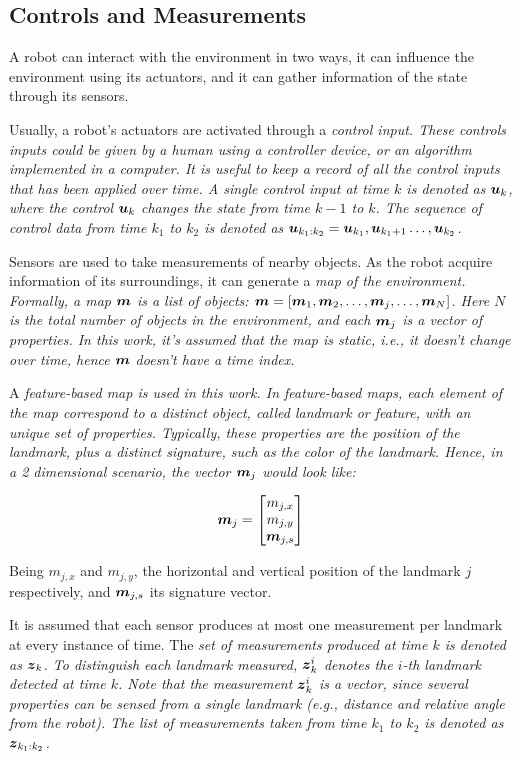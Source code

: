 \subsection{Controls and Measurements}

A robot can interact with the environment in two ways, it can influence the environment using its actuators, and it can gather information of the state through its sensors. 

Usually, a robot's actuators are activated through a \it{control input}. These controls inputs could be given by a human using a controller device, or an algorithm implemented in a computer. It is useful to keep a record of all the control inputs that has been applied over time. A single control input at time $k$ is denoted as $\boldsymbol{u}_k$, where the control $\boldsymbol{u}_k$ changes the state from  time $k-1$ to $k$. The sequence of control data from time $k_1$ to $k_2$ is denoted as $\boldsymbol{u}_{k_1:k_2}= \boldsymbol{u}_{k_1},\boldsymbol{u}_{k_1+1}\dots,\boldsymbol{u}_{k_2}$.

Sensors are used to take measurements of nearby objects. As the robot acquire information of its surroundings, it can generate a \it{map} of the environment. Formally, a map $\boldsymbol{m}$ is a list of objects: $\boldsymbol{m}=[\boldsymbol{m}_1,\boldsymbol{m}_2,\dots,\boldsymbol{m}_j,\dots,\boldsymbol{m}_N]$. Here $N$ is the total number of objects in the environment, and each $\boldsymbol{m}_j$ is a vector of properties. In this work, it's assumed that the map is static, i.e., it doesn't change over time, hence $\boldsymbol{m}$ doesn't have a time index.

A \it{feature-based} map is used in this work. In feature-based maps, each element of the map correspond to a distinct object, called \it{landmark} or \it{feature}, with an unique set of properties. Typically, these properties are the position of the landmark, plus a distinct signature, such as the color of the landmark. Hence, in a 2 dimensional scenario, the vector $\boldsymbol{m}_j$ would look like:

\begin{equation}
\boldsymbol{m}_j = \begin{bmatrix}
m_{j,x}\\
m_{j,y}\\
\boldsymbol{m}_{j,s}
\end{bmatrix}
\end{equation} 

Being $m_{j,x}$ and $m_{j,y}$, the horizontal and vertical position of the landmark $j$ respectively, and $\boldsymbol{m}_{j,s}$ its signature vector.

It is assumed that each sensor produces at most one measurement per landmark at every instance of time. The \it{set of measurements} produced at time $k$ is denoted as $\boldsymbol{z}_k$. To distinguish each landmark measured, $\boldsymbol{z}_k^i$ denotes the $i$-th landmark detected at time $k$. Note that the measurement $\boldsymbol{z}_k^i$ is a vector, since several properties can be sensed from a single landmark (e.g., distance and relative angle from the robot). The list of measurements taken from time $k_1$ to $k_2$ is denoted as $\boldsymbol{z}_{k_1:k_2}$.

